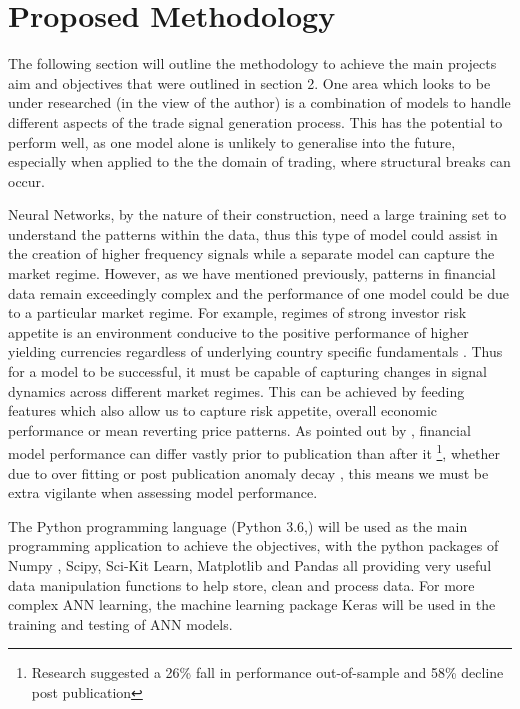 \documentclass[11pt, a4paper]{article}
\begin{document}
\section{Proposed Methodology}
The following section will outline the methodology to achieve the main projects aim and objectives that were outlined in section 2.
One area which looks to be under researched (in the view of the author) is a combination of models to handle different aspects of the trade signal generation process. This has the potential to perform well, as one model alone is unlikely to generalise into the future, especially when applied to the the domain of trading, where structural breaks can occur. \par Neural Networks, by the nature of their construction, need a large training set to understand the patterns within the data, thus this type of model could assist in the creation of higher frequency signals while a separate model can capture the market regime. \newline However, as we have mentioned previously, patterns in financial data remain exceedingly complex and the performance of one model could be due to a particular market regime. For example, regimes of strong investor risk appetite is an environment conducive to the positive performance of higher yielding currencies regardless of underlying country specific fundamentals \cite{Christiansen2011}. \newline Thus for a model to be successful, it must be capable of capturing changes in signal dynamics across different market regimes. This can be achieved by feeding features which also allow us to capture risk appetite, overall economic performance or mean reverting price patterns. 
\newline As pointed out by \cite{Mclean2016}, financial model performance can differ vastly prior to publication than after it \footnote{Research suggested a 26\% fall in performance out-of-sample and 58\% decline post publication}, whether due to over fitting or post publication anomaly decay \cite{Bartram2019}, this means we must be extra vigilante when assessing model performance.
\par The Python programming language (Python 3.6,\cite{McKinney1976}) will be used as the main programming application to achieve the objectives, with the python packages of Numpy \cite{VanDerWalt2011}, Scipy\cite{Tobergte2013}, Sci-Kit Learn\cite{Geron2017}, Matplotlib\cite{Wood2015} and Pandas\cite{Reiff2002} all providing very useful data manipulation functions to help store, clean and process data. For more complex ANN learning, the machine learning package Keras \cite{Chollet2015} will be used in the training and testing of ANN models.
\end{document}

